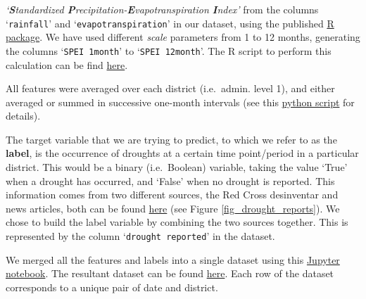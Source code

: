 \documentclass[10pt,parskip=half,
toc=sectionentrywithdots,
bibliography=totocnumbered,
captions=tableheading,numbers=noendperiod]{scrartcl}
\begin{document}
\begin{itemize}
  \emph{`\textbf{\emph{S}}tandardized
  \textbf{\emph{P}}recipitation-\textbf{\emph{E}}vapotranspiration
  \textbf{\emph{I}}ndex'} from the columns `\texttt{rainfall}' and
  `\texttt{evapotranspiration}' in our dataset, using the published
  \href{https://spei.csic.es/tools.html}{R package}. We have used
  different \emph{scale} parameters from 1 to 12 months, generating the
  columns `\texttt{SPEI\ 1month}' to `\texttt{SPEI\ 12month}'. The R
  script to perform this calculation can be find
  \href{https://github.com/rodekruis/IBF-system/blob/master/trigger-model-development/drought/skill-assessment/Model\%20Event\%20Data/SPEI_satellite/calc_SPEI.R}{here}.
\end{itemize}

All features were averaged over each district (i.e.~admin. level 1), and
either averaged or summed in successive one-month intervals (see this
\href{https://github.com/rodekruis/IBF-system/blob/master/trigger-model-development/drought/skill-assessment/GoogleEarthEngine/GEE_get_data.py}{python
script} for details).

The target variable that we are trying to predict, to which we refer to
as the \textbf{label}, is the occurrence of droughts at a certain time
point/period in a particular district. This would be a binary
(i.e.~Boolean) variable, taking the value `True' when a drought has
occurred, and `False' when no drought is reported. This information
comes from two different sources, the Red Cross desinventar and news
articles, both can be found
\href{https://rodekruis.sharepoint.com/sites/510-CRAVK-510/Gedeelde\%20\%20documenten/Forms/AllItems.aspx?RootFolder=\%2Fsites\%2F510\%2DCRAVK\%2D510\%2FGedeelde\%20\%20documenten\%2F\%5BCTRY\%5D\%20Uganda\%2F2\%2D\%20IBF\%20DROUGHT\%20UGANDA\%2FDROUGHT\%20EVENTS\%20\%26\%20IMPACT\%20ANALYSIS\&FolderCTID=0x012000D122CA8FA5B68345A13A32EDAA653915}{here}
(see Figure \ref{fig_drought_reports}). We chose to build the label
variable by combining the two sources together. This is represented by
the column `\texttt{drought\ reported}' in the dataset.

We merged all the features and labels into a single dataset using this
\href{https://github.com/rodekruis/IBF-system/blob/master/trigger-model-development/drought/skill-assessment/Model\%20Event\%20Data/combining\%20satellite\%20data\%20with\%20desinventar\%20events\%20and\%20news\%20article\%20events\%20.ipynb}{Jupyter
notebook}. The resultant dataset can be found
\href{https://github.com/rodekruis/IBF-system/blob/master/trigger-model-development/drought/skill-assessment/Model\%20Event\%20Data/datasets/Droughts_satelite_and_events.csv}{here}.
Each row of the dataset corresponds to a unique pair of date and
district.
\end{document}
